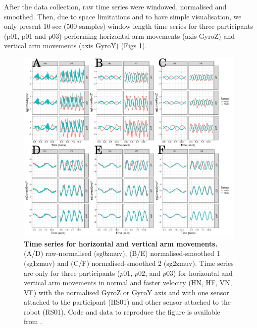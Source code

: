 \documentclass[fleqn,10pt]{wlscirep}
\begin{document}
After the data collection, raw time series were windowed, normalised and 
smoothed. Then, due to space limitations and to have simple visualisation, 
we only present 10-sec (500 samples) window length time series for 
three participants (p01, p01 and p03) performing horizontal 
arm movements (axis GyroZ) and vertical arm movements (axis GyroY) (Figs \ref{fig:ts}). 
\begin{figure}[ht]
\centering
\includegraphics[width=1.0\textwidth]{figures/timeseries/pdf/fig1}
    	\caption{ 
	{\bf Time series for horizontal and vertical arm movements.}
		(A/D) raw-normalised (sg0zmuv), 
		(B/E) normalised-smoothed 1 (sg1zmuv) and
		(C/F) normalised-smoothed 2 (sg2zmuv).
		Time series are only for three participants 
		($p01$, $p02$, and $p03$) 
		for horizontal and vertical arm movements in normal 
		and faster velocity (HN, HF, VN, VF) 
		with the normalised GyroZ or GyroY axis 
		and with one sensor attached to the participant (HS01) 
		and other sensor attached to the robot (RS01).	
	Code and data to reproduce the figure is available from \cite{srep2019}.
        }
    \label{fig:ts}
\end{figure}
\end{document}
